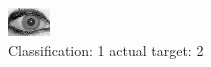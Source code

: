 \begin{figure}[h!]
\begin{center}
\includegraphics[width=0.60\columnwidth]{figures/ID2005_class_1_target_2.png}
\end{center}
\caption{ Classification: 1 actual target: 2}
\label{fig:ID2005_class_1_target_2}
\end{figure}
